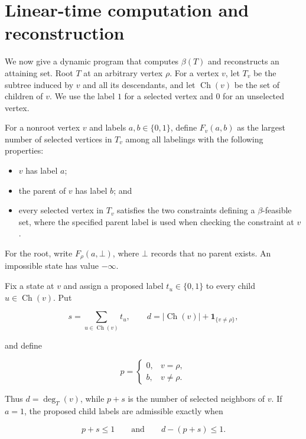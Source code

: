 \documentclass[11pt,a4paper]{article}
\providecommand{\tightlist}{%
  \setlength{\itemsep}{0pt}\setlength{\parskip}{0pt}}
\numberwithin{equation}{section}
\begin{document}
\section{Linear-time computation and reconstruction}\label{sec:algorithm}

We now give a dynamic program that computes \(\beta(T)\) and
reconstructs an attaining set. Root \(T\) at an arbitrary vertex
\(\rho\). For a vertex \(v\), let \(T_v\) be the subtree induced by
\(v\) and all its descendants, and let \(\operatorname{Ch}(v)\) be the
set of children of \(v\). We use the label \(1\) for a selected vertex
and \(0\) for an unselected vertex.

For a nonroot vertex \(v\) and labels \(a,b\in\{0,1\}\), define
\(F_v(a,b)\) as the largest number of selected vertices in \(T_v\) among
all labelings with the following properties:

\begin{itemize}
\tightlist
\item
  \(v\) has label \(a\);
\item
  the parent of \(v\) has label \(b\); and
\item
  every selected vertex in \(T_v\) satisfies the two constraints
  defining a \(\beta\)-feasible set, where the specified parent label is
  used when checking the constraint at \(v\).
\end{itemize}

For the root, write \(F_\rho(a,\bot)\), where \(\bot\) records that no
parent exists. An impossible state has value \(-\infty\).

Fix a state at \(v\) and assign a proposed label \(t_u\in\{0,1\}\) to
every child \(u\in\operatorname{Ch}(v)\). Put

\[
s=\sum_{u\in\operatorname{Ch}(v)}t_u,
\qquad
d=|\operatorname{Ch}(v)|+\mathbf 1_{\{v\ne\rho\}},
\]

and define

\[
p=
\begin{cases}
0,&v=\rho,\\
b,&v\ne\rho.
\end{cases}
\]

Thus \(d=\deg_T(v)\), while \(p+s\) is the number of selected neighbors
of \(v\). If \(a=1\), the proposed child labels are admissible exactly
when

\nopagebreak[4]
\begin{equation}\label{eq:local-state-constraint}
p+s\le 1
\qquad\text{and}\qquad
d-(p+s)\le 1.
\end{equation}
\end{document}
